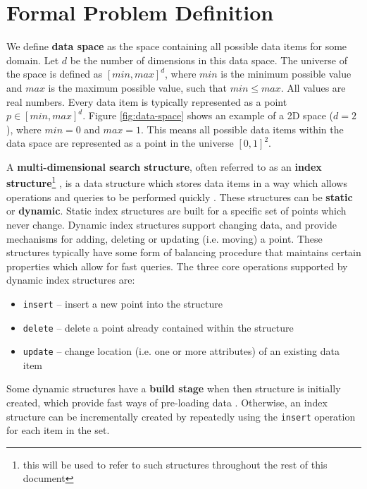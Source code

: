 \section{Formal Problem Definition}
\label{sec:definition}

We define \textbf{data space} as the space containing all possible data items for some domain. Let $d$ be the number of dimensions in this data space. The universe of the space is defined as $[min,max]^d$, where $min$ is the minimum possible value and $max$ is the maximum possible value, such that $min \leq max$. All values are real numbers. Every data item is typically represented as a point $p \in [min,max]^d$. Figure \ref{fig:data-space} shows an example of a 2D space ($d = 2$), where $min = 0$ and $max = 1$. This means all possible data items within the data space are represented as a point in the universe $[0, 1]^2$.

A \textbf{multi-dimensional search structure}, often referred to as an \textbf{index structure}\footnote{this will be used to refer to such structures throughout the rest of this document} \cite{r-tree-variants}, is a data structure which stores data items in a way which allows operations and queries to be performed quickly \cite{dynamic-data-structures}. These structures can be \textbf{static} or \textbf{dynamic}. Static index structures are built for a specific set of points which never change. Dynamic index structures support changing data, and provide mechanisms for adding, deleting or updating (i.e. moving) a point. These structures typically have some form of balancing procedure \cite{dynamic-data-structures} that maintains certain properties which allow for fast queries. The three core operations supported by dynamic index structures are:
\begin{itemize}
	\item \texttt{insert} -- insert a new point into the structure
	\item \texttt{delete} -- delete a point already contained within the structure
	\item \texttt{update} -- change location (i.e. one or more attributes) of an existing data item
\end{itemize}
Some dynamic structures have a \textbf{build stage} when then structure is initially created, which provide fast ways of pre-loading data \cite{pyramid-tree}. Otherwise, an index structure can be incrementally created by repeatedly using the \texttt{insert} operation for each item in the set.

